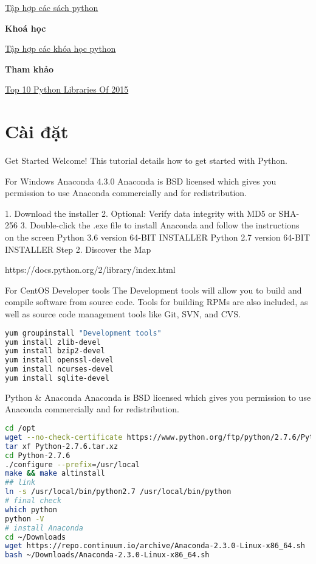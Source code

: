 \href{https://docs.google.com/document/d/1gQFMXZtynpuTenoOQNGCHttArT4NspTWcyJQr5ps9Mk/edit?usp=sharing}{Tập hợp các sách python}

\textbf{Khoá học}

\href{1frO9QYhgsXbMzcyXoA4czWkxTWF8RBTJVf9uoO1rElU}{Tập hợp các khóa học python}

\textbf{Tham khảo}

\href{http://blog.tryolabs.com/2015/12/15/top-10-python-libraries-of-2015/}{Top 10 Python Libraries Of 2015}

\section{Cài đặt}

Get Started
Welcome! This tutorial details how to get started with Python.

For Windows
Anaconda 4.3.0
Anaconda is BSD licensed which gives you permission to use Anaconda commercially and for redistribution.

1. Download the installer
2. Optional: Verify data integrity with MD5 or SHA-256
3. Double-click the .exe file to install Anaconda and follow the instructions on the screen
Python 3.6 version
64-BIT INSTALLER
Python 2.7 version
64-BIT INSTALLER
Step 2. Discover the Map

https://docs.python.org/2/library/index.html

For CentOS
Developer tools
The Development tools will allow you to build and compile software from source code. Tools for building RPMs are also included, as well as source code management tools like Git, SVN, and CVS.

\begin{lstlisting}[language=bash]
yum groupinstall "Development tools"
yum install zlib-devel
yum install bzip2-devel
yum install openssl-devel
yum install ncurses-devel
yum install sqlite-devel
\end{lstlisting}

Python & Anaconda
Anaconda is BSD licensed which gives you permission to use Anaconda commercially and for redistribution.

\begin{lstlisting}[language=bash]
cd /opt
wget --no-check-certificate https://www.python.org/ftp/python/2.7.6/Python-2.7.6.tar.xz
tar xf Python-2.7.6.tar.xz
cd Python-2.7.6
./configure --prefix=/usr/local
make && make altinstall
## link
ln -s /usr/local/bin/python2.7 /usr/local/bin/python
# final check
which python
python -V
# install Anaconda
cd ~/Downloads
wget https://repo.continuum.io/archive/Anaconda-2.3.0-Linux-x86_64.sh
bash ~/Downloads/Anaconda-2.3.0-Linux-x86_64.sh
\end{lstlisting}

